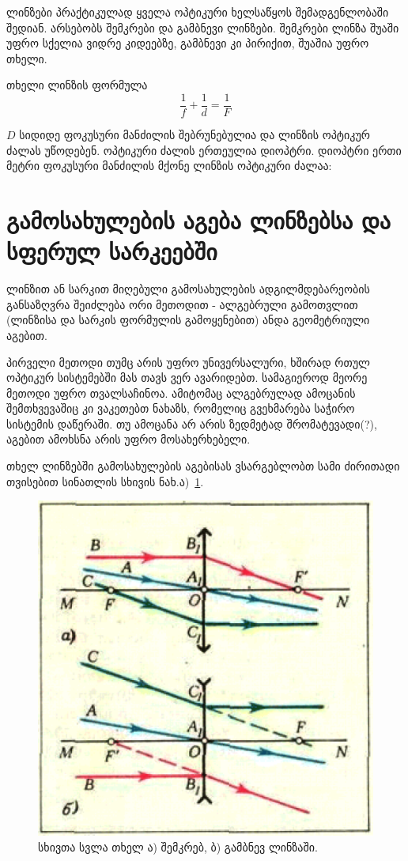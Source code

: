 \documentclass{book}
\begin{document}
ლინზები პრაქტიკულად ყველა ოპტიკური ხელსაწყოს შემადგენლობაში შედიან. არსებობს შემკრები და გამბნევი ლინზები. შემკრები ლინზა შუაში უფრო სქელია ვიდრე კიდეებზე, გამბნევი კი პირიქით, შუაშია უფრო თხელი.

თხელი ლინზის ფორმულა
	\begin{equation}
		\frac{1}{f} + \frac{1}{d} = \frac{1}{F}
	\end{equation}

$D$ სიდიდე ფოკუსური მანძილის შებრუნებულია და ლინზის ოპტიკურ ძალას უწოდებენ. ოპტიკური ძალის ერთეულია დიოპტრი. დიოპტრი ერთი მეტრი ფოკუსური მანძილის მქონე ლინზის ოპტიკური ძალაა:


\section{გამოსახულების აგება ლინზებსა და სფერულ სარკეებში}
ლინზით ან სარკით მიღებული გამოსახულების ადგილმდებარეობის განსაზღვრა შეიძლება ორი მეთოდით - ალგებრული გამოთვლით (ლინზისა და სარკის ფორმულის გამოყენებით) ანდა გეომეტრიული აგებით.

პირველი მეთოდი თუმც არის უფრო უნივერსალური, ხშირად რთულ ოპტიკურ სისტემებში მას თავს ვერ ავარიდებთ. სამაგიეროდ მეორე მეთოდი უფრო თვალსაჩინოა. ამიტომაც ალგებრულად ამოცანის შემთხვევაშიც კი ვაკეთებთ ნახაზს, რომელიც გვეხმარება საჭირო სისტემის დაწერაში. თუ ამოცანა არ არის ზედმეტად შრომატევადი(?), აგებით ამოხსნა არის უფრო მოსახერხებელი.

თხელ ლინზებში გამოსახულების აგებისას ვსარგებლობთ სამი ძირითადი თვისებით სინათლის სხივის ნახ.ა)~\ref{fig:optics_1}.
		\begin{figure}[h]
		   \centering
           \includegraphics[width=0.5\columnwidth]{figures/optics_1}
           \caption{სხივთა სვლა თხელ ა) შემკრებ, ბ) გამბნევ ლინზაში.}
           \label{fig:optics_1}
        \end{figure}
\end{document}
